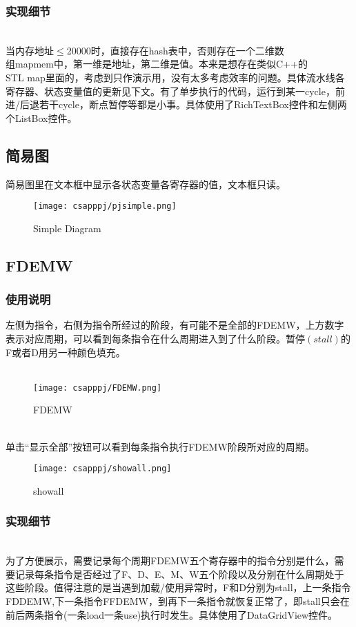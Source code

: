 \documentclass{article}
\begin{document}
\begin{spacing}{1.5}
\subsubsection{实现细节}
\noindent
{}
\setlength{\hangindent}{3.5em}
\\
当内存地址$\leq$20000时，直接存在hash表中，否则存在一个二维数\\
组mapmem中，第一维是地址，第二维是值。本来是想存在类似C++的\\
STL map里面的，考虑到只作演示用，没有太多考虑效率的问题。具体流水线各
寄存器、状态变量值的更新见下文。有了单步执行的代码，运行到某一cycle，前进/后退若干cycle，断点暂停等都是小事。具体使用了RichTextBox控件和左侧两个ListBox控件。
\subsection{简易图}
\noindent
{}
\setlength{\hangindent}{2.8em}
简易图里在文本框中显示各状态变量各寄存器的值，文本框只读。
\begin{figure}[htbp]
\centering
\texttt{[image: csapppj/pjsimple.png]}
\caption{Simple Diagram}
\end{figure}

\subsection{FDEMW}
\subsubsection{使用说明}
\noindent
{}
\setlength{\hangindent}{3.5em}
左侧为指令，右侧为指令所经过的阶段，有可能不是全部的FDEMW，上方数字表示对应周期，可以看到每条指令在什么周期进入到了什么阶段。暂停$\left( stall \right)$的F或者D用另一种颜色填充。\\\\
\begin{figure}[htbp]
\centering
\texttt{[image: csapppj/FDEMW.png]}
\caption{FDEMW}
\end{figure}\\
单击“显示全部”按钮可以看到每条指令执行FDEMW阶段所对应的周期。
\begin{figure}[htbp]
\centering
\texttt{[image: csapppj/showall.png]}
\caption{showall}
\end{figure}
\subsubsection{实现细节}
\noindent
{}
\setlength{\hangindent}{3.5em}\\
为了方便展示，需要记录每个周期FDEMW五个寄存器中的指令分别是什么，需要记录每条指令是否经过了F、D、E、M、W五个阶段以及分别在什么周期处于这些阶段。值得注意的是当遇到加载/使用异常时，F和D分别为stall，上一条指令FDDEMW,下一条指令FFDEMW，到再下一条指令就恢复正常了，即stall只会在前后两条指令(一条load一条use)执行时发生。具体使用了DataGridView控件。

\end{spacing}
\end{document}
